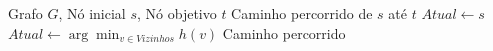 \begin{algorithm}[H]%
  \caption{Exemplo de Algoritmo de Busca}
  \label{alg:exemplo_busca}
  \begin{algorithmic}[1]
    \Require Grafo $G$, Nó inicial $s$, Nó objetivo $t$
    \Ensure Caminho percorrido de $s$ até $t$
    \State $Atual \gets s$
      \State $Atual \gets \arg\min_{v \in Vizinhos} h(v)$ 
    \EndWhile
    \State \Return Caminho percorrido
  \end{algorithmic}
\end{algorithm}
